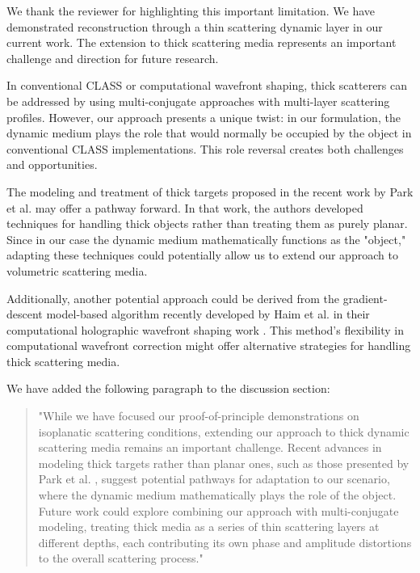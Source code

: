 \documentclass[12pt]{article}
\newenvironment{ourresponse}
    {\begin{tcolorbox}[width=\linewidth,breakable,enhanced,colback=gray!5,colframe=responsecolor!50,title=Response,left=5pt,right=5pt]}
    {\end{tcolorbox}}
\begin{document}
\begin{ourresponse}
    We thank the reviewer for highlighting this important limitation. We have demonstrated reconstruction through a thin scattering dynamic layer in our current work. The extension to thick scattering media represents an important challenge and direction for future research.

    In conventional CLASS or computational wavefront shaping, thick scatterers can be addressed by using multi-conjugate approaches with multi-layer scattering profiles. However, our approach presents a unique twist: in our formulation, the dynamic medium plays the role that would normally be occupied by the object in conventional CLASS implementations. This role reversal creates both challenges and opportunities.
    
    The modeling and treatment of thick targets proposed in the recent work by Park et al. \cite{oh2025digital} may offer a pathway forward. In that work, the authors developed techniques for handling thick objects rather than treating them as purely planar. Since in our case the dynamic medium mathematically functions as the "object," adapting these techniques could potentially allow us to extend our approach to volumetric scattering media.

    Additionally, another potential approach could be derived from the gradient-descent model-based algorithm recently developed by Haim et al. in their computational holographic wavefront shaping work \cite{haim2025image}. This method's flexibility in computational wavefront correction might offer alternative strategies for handling thick scattering media.
    
    We have added the following paragraph to the discussion section:
    \begin{quote}
        "While we have focused our proof-of-principle demonstrations on isoplanatic scattering conditions, extending our approach to thick dynamic scattering media remains an important challenge. Recent advances in modeling thick targets rather than planar ones, such as those presented by Park et al. \cite{oh2025digital}, suggest potential pathways for adaptation to our scenario, where the dynamic medium mathematically plays the role of the object. Future work could explore combining our approach with multi-conjugate modeling, treating thick media as a series of thin scattering layers at different depths, each contributing its own phase and amplitude distortions to the overall scattering process."
    \end{quote}
    
\end{ourresponse}
\end{document}
